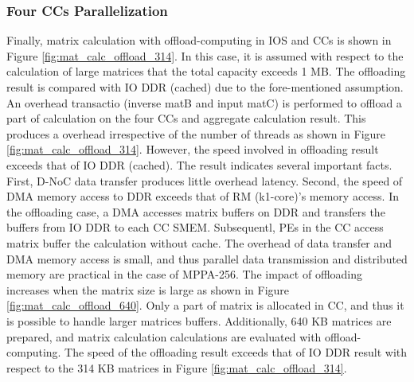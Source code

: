 \documentclass{sig-alternate-05-2015}
\begin{document}
\subsubsection{Four CCs Parallelization}
\label{sec:four_CCs}
Finally, matrix calculation with offload-computing in IOS and CCs is shown in Figure \ref{fig:mat_calc_offload_314}.
In this case, it is assumed with respect to the calculation of large matrices that the total capacity exceeds 1 MB.
The offloading result is compared with IO DDR (cached) due to the fore-mentioned assumption. 
An overhead transactio (inverse matB and input matC) is performed to offload a part of calculation on the four CCs and aggregate calculation result.
This produces a overhead irrespective of the number of threads as shown in Figure \ref{fig:mat_calc_offload_314}.
However, the speed involved in offloading result exceeds that of IO DDR (cached).
The result indicates several important facts.
First, D-NoC data transfer produces little overhead latency.
Second, the speed of DMA memory access to DDR exceeds that of RM (k1-core)'s memory access.
In the offloading case, a DMA accesses matrix buffers on DDR and transfers the buffers from IO DDR to each CC SMEM.
Subsequentl, PEs in the CC access matrix buffer the calculation without cache.
The overhead of data transfer and DMA memory access is small, and thus parallel data transmission and distributed memory are practical in the case of MPPA-256.
The impact of offloading increases when the matrix size is large as shown in Figure \ref{fig:mat_calc_offload_640}.
Only a part of matrix is allocated in CC, and thus it is possible to handle larger matrices buffers.
Additionally, 640 KB matrices are prepared, and matrix calculation calculations are evaluated with offload-computing.
The speed of the offloading result exceeds that of IO DDR result with respect to the 314 KB matrices in Figure \ref{fig:mat_calc_offload_314}.
\end{document}
